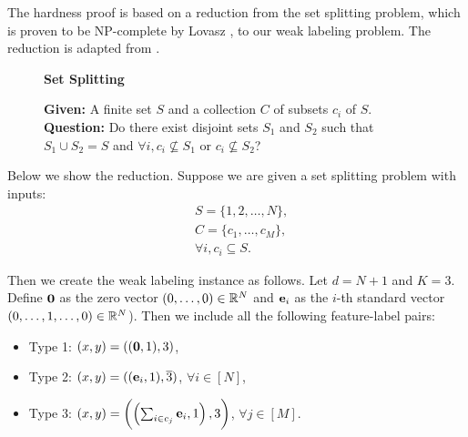 
The hardness proof is based on a reduction from the set splitting problem, which is proven to be NP-complete by Lovasz \cite{garey1979computers}, to our weak labeling problem. The reduction is adapted from \cite{blum1989training}. 
\begin{figure}[h]
\begin{framed}
\begin{center}
    \textbf{Set Splitting}
\end{center}
\textbf{Given: } A finite set $S$ and a collection $C$ of subsets $c_i$ of $S$. \\
\textbf{Question: } Do there exist disjoint sets $S_1$ and $S_2$ such that $S_1 \cup S_2 = S$ and $\forall i, c_i\not\subseteq S_1$ or $c_i\not\subseteq S_2$? 
\end{framed}
\end{figure}

Below we show the reduction. Suppose we are given a set splitting problem with inputs: 
\begin{align*}
    &S = \{1, 2, \ldots, N\}, \\
    &C = \{c_1, \ldots, c_M\}, \\ 
    &\forall i, c_i \subseteq S. 
\end{align*}

Then we create the weak labeling instance as follows. Let $d=N+1$ and $K=3$. Define $\mathbf{0}$ as the zero vector $(0,\ldots, 0)\in \mathbb{R}^N$ and $\mathbf{e}_i$ as the $i$-th standard vector $(0,\ldots, 1, \ldots, 0)\in \mathbb{R}^N$). Then we include all the following feature-label pairs: 
\begin{itemize}
    \item Type 1: $(x,y)=((\mathbf{0},1), 3)$,
    \item Type 2: $(x,y)=((\mathbf{e}_i,1), \overline{3})$, $\forall i\in [N]$,
    \item Type 3: $(x,y)=\left(\left(\sum_{i\in c_j} \mathbf{e}_i, 1\right), 3\right)$, $\forall j\in[M]$.  
\end{itemize}

